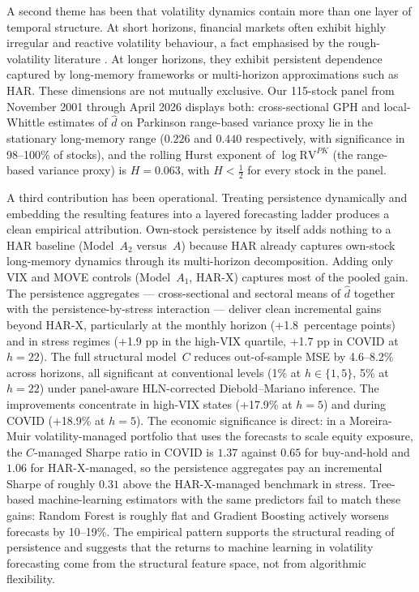 \documentclass[11pt,a4paper]{article}
\newcommand{\RVPK}{\mathrm{RV}^{PK}}
\newcommand{\dhat}{\hat d}
\begin{document}
A second theme has been that volatility dynamics contain more than one
layer of temporal structure. At short horizons, financial markets often
exhibit highly irregular and reactive volatility behaviour, a fact
emphasised by the rough-volatility literature
\citep{gatheral2018volatility}. At longer horizons, they exhibit
persistent dependence captured by long-memory frameworks or multi-horizon
approximations such as HAR. These dimensions are not mutually exclusive.
Our 115-stock panel from November 2001 through April 2026 displays
both: cross-sectional GPH and local-Whittle estimates of $\dhat$ on
Parkinson range-based variance proxy lie in the stationary long-memory range
($0.226$ and $0.440$ respectively, with significance in 98--100\% of
stocks), and the rolling Hurst exponent of $\log\RVPK$ (the range-based
variance proxy) is $H = 0.063$, with $H<\tfrac12$ for every stock in the
panel.

A third contribution has been operational. Treating persistence
dynamically and embedding the resulting features into a layered
forecasting ladder produces a clean empirical attribution. Own-stock
persistence by itself adds nothing to a HAR baseline (Model~$A_2$
versus~$A$) because HAR already captures own-stock long-memory
dynamics through its multi-horizon decomposition. Adding only VIX and
MOVE controls (Model~$A_1$, HAR-X) captures most of the pooled gain.
The persistence aggregates --- cross-sectional and sectoral means of
$\dhat$ together with the persistence-by-stress interaction --- deliver
clean incremental gains beyond HAR-X, particularly at the monthly
horizon (+1.8~percentage points) and in stress regimes (+1.9 pp in the
high-VIX quartile, +1.7 pp in COVID at $h=22$). The full structural
model~$C$ reduces out-of-sample MSE by 4.6--8.2\% across horizons,
all significant at conventional levels (1\% at $h\in\{1,5\}$, 5\% at $h=22$) under panel-aware HLN-corrected
Diebold--Mariano inference. The improvements concentrate in high-VIX
states (+17.9\% at $h=5$) and during COVID (+18.9\% at $h=5$). The
economic significance is direct: in a Moreira-Muir volatility-managed
portfolio that uses the forecasts to scale equity exposure, the
$C$-managed Sharpe ratio in COVID is $1.37$ against $0.65$ for
buy-and-hold and $1.06$ for HAR-X-managed, so the persistence
aggregates pay an incremental Sharpe of roughly $0.31$ above the
HAR-X-managed benchmark in stress. Tree-based machine-learning
estimators with the same predictors fail to match these gains: Random
Forest is roughly flat and Gradient Boosting actively worsens
forecasts by 10--19\%. The empirical pattern supports the structural
reading of persistence and suggests that the returns to machine
learning in volatility forecasting come from the structural feature
space, not from algorithmic flexibility.
\end{document}
